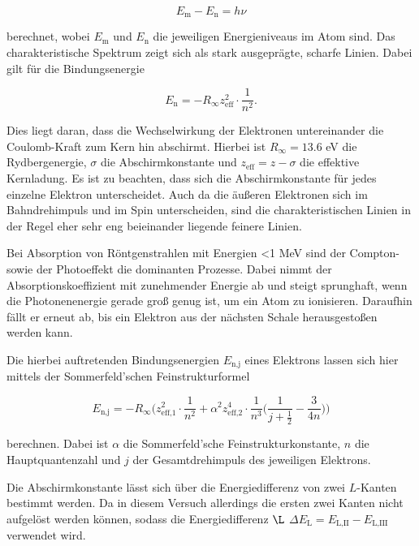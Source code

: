 \begin{equation}
    \label{eqn:schalen}
    E_\text{m} - E_\text{n} = h \nu
\end{equation}

berechnet, wobei $E_\text{m}$ und $E_\text{n}$ die jeweiligen Energieniveaus im Atom sind.
Das charakteristische Spektrum zeigt sich als stark ausgeprägte, scharfe Linien.
Dabei gilt für die Bindungsenergie

\begin{equation}
    \label{eqn:Bindungsenergie}
    E_\text{n} = -R_\infty z_\text{eff}^2 \cdot \frac{1}{n^2}.
\end{equation}

Dies liegt daran, dass die Wechselwirkung der Elektronen untereinander die Coulomb-Kraft zum Kern hin abschirmt.
Hierbei ist $R_\infty = 13.6$ eV die Rydbergenergie, $\sigma$ die Abschirmkonstante und $z_\text{eff} = z - \sigma$ die effektive Kernladung.
Es ist zu beachten, dass sich die Abschirmkonstante für jedes einzelne Elektron unterscheidet.
Auch da die äußeren Elektronen sich im Bahndrehimpuls und im Spin unterscheiden, sind die charakteristischen Linien in der Regel eher sehr eng beieinander liegende feinere Linien.

Bei Absorption von Röntgenstrahlen mit Energien <1 MeV sind der Compton- sowie der Photoeffekt die dominanten Prozesse.
Dabei nimmt der Absorptionskoeffizient mit zunehmender Energie ab und steigt sprunghaft, wenn die Photonenenergie gerade groß genug ist, um ein Atom zu ionisieren.
Daraufhin fällt er erneut ab, bis ein Elektron aus der nächsten Schale herausgestoßen werden kann.

Die hierbei auftretenden Bindungsenergien $E_\text{n,j}$ eines Elektrons lassen sich hier mittels der Sommerfeld'schen Feinstrukturformel 

\begin{equation}
    \label{eqn:fein-struktur}
    E_\text{n,j} = -R_\infty \bigg( z_\text{eff,1}^2 \cdot \frac{1}{n^2} + \alpha^2 z_\text{eff,2}^4 \cdot \frac{1}{n^3} \bigg( \frac{1}{j + \frac{1}{2}} - \frac{3}{4n} \bigg) \bigg)
\end{equation}

berechnen. Dabei ist $\alpha$ die Sommerfeld'sche Feinstrukturkonstante, $n$ die Hauptquantenzahl und $j$ der Gesamtdrehimpuls des jeweiligen Elektrons.

Die Abschirmkonstante lässt sich über die Energiedifferenz von zwei $L$-Kanten bestimmt werden. 
Da in diesem Versuch allerdings die ersten zwei Kanten nicht aufgelöst werden können, 
sodass die Energiedifferenz $\L$ $\Delta E_\text{L} = E_\text{L,II} - E_\text{L,III}$ verwendet wird.

